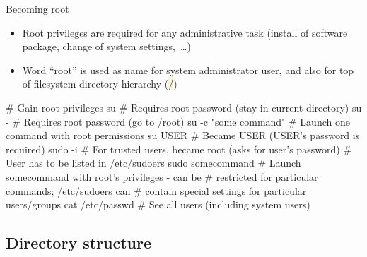 \documentclass[compress, ucs, xelatex, 11pt, xcolor=svgnames, aspectratio=169,
	hyperref={
		bookmarks=true,
		unicode=true,
		colorlinks=true,
		pdftitle={Linux, command line and MetaCentrum},
		plainpages=false,
		pdfauthor={Vojtech Zeisek},
		pdfsubject={Course about use of Linux command line, writing shell scripts and using MetaCentrum of CESNET},
		pdfcreator={XeLaTeX},
		pdfkeywords={Linux, GNU, BASH, shell, command line, MetaCentrum},
		linkcolor=DarkRed, %
		anchorcolor=DarkBlue, %
		citecolor=Indigo, %
		filecolor=NavyBlue, %
		menucolor=DarkMagenta, %
		urlcolor=DarkBlue, %
		pdftex},
	url={hyphens, lowtilde} %
	]{beamer}
\renewcommand{\texttt}[1]{\colorbox{Beige}{{\ttfamily #1}}}
\begin{document}
\begin{frame}[fragile]{Becoming root}
	\begin{itemize}
		\item Root privileges are required for any administrative task (install of software package, change of system settings,~\ldots)
		\item Word \enquote{root} is used as name for system administrator user, and also for top of filesystem directory hierarchy (\texttt{/})
	\end{itemize}
	\begin{bashcode}
    # Gain root privileges
    su # Requires root password (stay in current directory)
    su - # Requires root password (go to /root)
    su -c "some command" # Launch one command with root permissions
    su USER # Became USER (USER's password is required)
    sudo -i # For trusted users, became root (asks for user's password)
            # User has to be listed in /etc/sudoers
    sudo somecommand # Launch somecommand with root's privileges - can be
                     # restricted for particular commands; /etc/sudoers can
                     # contain special settings for particular users/groups
    cat /etc/passwd # See all users (including system users)
	\end{bashcode}
\end{frame}

\subsection{Directory structure}
\end{document}
